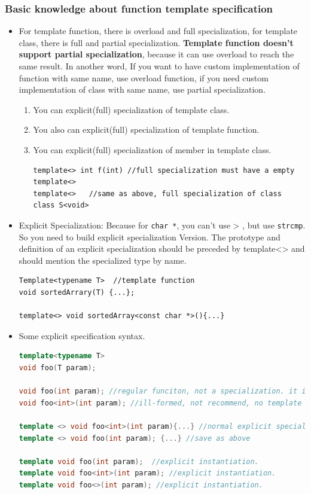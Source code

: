 \documentclass[a4paper,11pt,twoside]{book}
\begin{document}
\subsubsection{Basic knowledge about function template specification}
\begin{itemize}

    \item For template function, there is overload and full specialization, for template class, there is full and partial specialization. \textbf{Template function doesn't support partial specialization}, because it can use overload to reach the same result. In another word, If you want to have custom implementation of function with same name, use overload function, if you need  custom implementation of class with same name, use partial specialization.

    \begin{enumerate}
	\item You can explicit(full) specialization of template class. 
	\item You also can explicit(full) specialization of template function. 
	\item You can explicit(full) specialization of member in template class. 
\begin{lstlisting}
template<> int f(int) //full specialization must have a empty template<>
template<>   //same as above, full specialization of class
class S<void>
\end{lstlisting}
	\end{enumerate}


    \item Explicit Specialization: Because for \texttt{char *}, you can't use > , but use \texttt{strcmp}.  So you need to build explicit specialization Version. The prototype and definition of an explicit specialization should be preceded by template<> and should mention the specialized type by name.
	
\begin{lstlisting}[numbers=none]
Template<typename T>  //template function
void sortedArrary(T) {...};

template<> void sortedArray<const char *>(){...}
\end{lstlisting}

\item Some explicit specification syntax.
\begin{lstlisting}[frame=single, language=c++]
template<typename T>
void foo(T param);

void foo(int param); //regular funciton, not a specialization. it is an overload
void foo<int>(int param); //ill-formed, not recommend, no template keyword at all

template <> void foo<int>(int param){...} //normal explicit specialization
template <> void foo(int param); {...} //save as above

template void foo(int param);  //explicit instantiation.
template void foo<int>(int param); //explicit instantiation.
template void foo<>(int param); //explicit instantiation.
\end{lstlisting}

\end{itemize}
\end{document}
